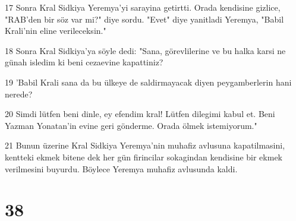 \par 17 Sonra Kral Sidkiya Yeremya'yi sarayina getirtti. Orada kendisine gizlice, "RAB'den bir söz var mi?" diye sordu. "Evet" diye yanitladi Yeremya, "Babil Krali'nin eline verileceksin."
\par 18 Sonra Kral Sidkiya'ya söyle dedi: "Sana, görevlilerine ve bu halka karsi ne günah isledim ki beni cezaevine kapattiniz?
\par 19 'Babil Krali sana da bu ülkeye de saldirmayacak diyen peygamberlerin hani nerede?
\par 20 Simdi lütfen beni dinle, ey efendim kral! Lütfen dilegimi kabul et. Beni Yazman Yonatan'in evine geri gönderme. Orada ölmek istemiyorum."
\par 21 Bunun üzerine Kral Sidkiya Yeremya'nin muhafiz avlusuna kapatilmasini, kentteki ekmek bitene dek her gün firincilar sokagindan kendisine bir ekmek verilmesini buyurdu. Böylece Yeremya muhafiz avlusunda kaldi.

\chapter{38}

